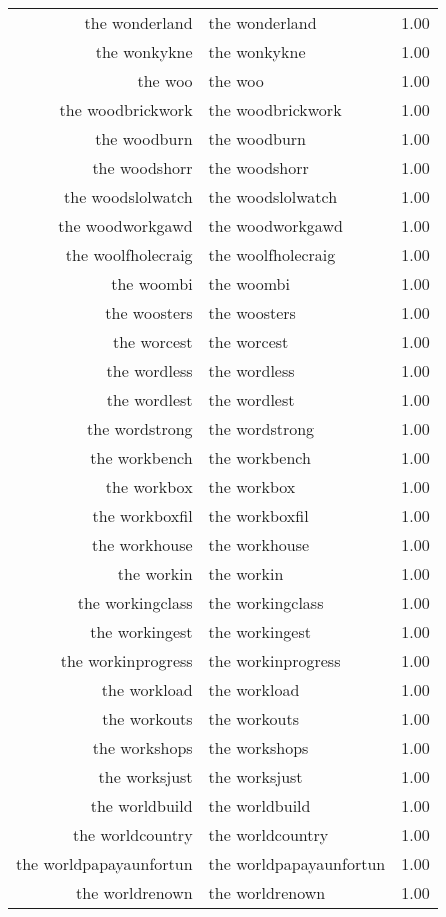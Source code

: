 \begin{table}[ht]
\begin{tabular}{rlr}
  the wonderland & the wonderland & 1.00 \\ 
  the wonkykne & the wonkykne & 1.00 \\ 
  the woo & the woo & 1.00 \\ 
  the woodbrickwork & the woodbrickwork & 1.00 \\ 
  the woodburn & the woodburn & 1.00 \\ 
  the woodshorr & the woodshorr & 1.00 \\ 
  the woodslolwatch & the woodslolwatch & 1.00 \\ 
  the woodworkgawd & the woodworkgawd & 1.00 \\ 
  the woolfholecraig & the woolfholecraig & 1.00 \\ 
  the woombi & the woombi & 1.00 \\ 
  the woosters & the woosters & 1.00 \\ 
  the worcest & the worcest & 1.00 \\ 
  the wordless & the wordless & 1.00 \\ 
  the wordlest & the wordlest & 1.00 \\ 
  the wordstrong & the wordstrong & 1.00 \\ 
  the workbench & the workbench & 1.00 \\ 
  the workbox & the workbox & 1.00 \\ 
  the workboxfil & the workboxfil & 1.00 \\ 
  the workhouse & the workhouse & 1.00 \\ 
  the workin & the workin & 1.00 \\ 
  the workingclass & the workingclass & 1.00 \\ 
  the workingest & the workingest & 1.00 \\ 
  the workinprogress & the workinprogress & 1.00 \\ 
  the workload & the workload & 1.00 \\ 
  the workouts & the workouts & 1.00 \\ 
  the workshops & the workshops & 1.00 \\ 
  the worksjust & the worksjust & 1.00 \\ 
  the worldbuild & the worldbuild & 1.00 \\ 
  the worldcountry & the worldcountry & 1.00 \\ 
  the worldpapayaunfortun & the worldpapayaunfortun & 1.00 \\ 
  the worldrenown & the worldrenown & 1.00 \\ 

\end{tabular}
\end{table}
